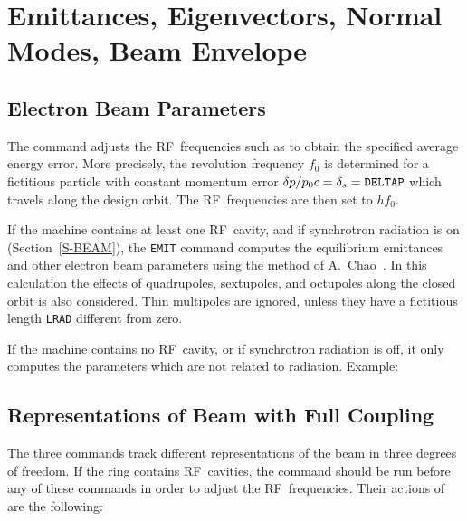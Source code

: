 \section{Emittances, Eigenvectors, Normal Modes, Beam Envelope}
 
\subsection{Electron Beam Parameters}
\label{S-EMIT}
The command
adjusts the RF~frequencies such as to obtain the specified average
energy error.
More precisely,
the revolution frequency \(f_0\) is determined for a fictitious particle
with constant momentum error
\(\delta p / p_0 c = \delta_s = \hbox{\tt DELTAP}\)
which travels along the design orbit.
The RF~frequencies are then set to \(h f_0\).
 
If the machine contains at least one RF~cavity, and if synchrotron
radiation is on (Section~\ref{S-BEAM}),
the {\tt EMIT} command computes the equilibrium emittances and other
electron beam parameters using the method of A.~Chao~\cite{B-CHAO}.
In this calculation the effects of quadrupoles, sextupoles, and
octupoles along the closed orbit is also considered.
Thin multipoles are ignored,
unless they have a fictitious length {\tt LRAD} different from zero.
 
If the machine contains no RF~cavity, or if synchrotron radiation is
off, it only computes the parameters which are not related to
radiation.
Example:
 
\subsection{Representations of Beam with Full Coupling}
\label{S-EIGEN}
\label{S-ENVE}
\label{S-TWS3}
The three commands
track different representations of the beam in three degrees of
freedom.
If the ring contains RF~cavities, the command  should be run
before any of these commands in order to adjust the RF~frequencies.
Their actions of are the following:
 

